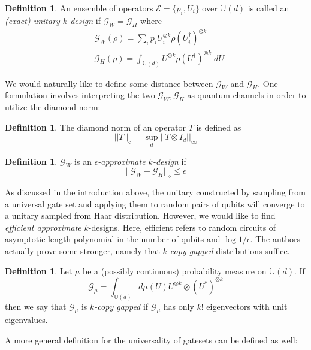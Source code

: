 \documentclass[12pt]{amsart}
\theoremstyle{definition}
\newtheorem{definition}[theorem]{Definition}
\theoremstyle{remark}
\numberwithin{equation}{section}
\theoremstyle{remark}
\begin{document}
\begin{definition}
  An ensemble of operators $\mathcal{E} = \{p_i, U_i\}$ over $\mathbb{U}(d)$ is called an \emph{(exact) unitary $k$-design} if $\mathcal{G}_W = \mathcal{G}_H$ where
  \begin{align}
    & \mathcal{G}_W(\rho) = \sum_{i} p_i U_i^{\otimes k}\rho (U_i^{\dagger})^{\otimes k} \\
    & \mathcal{G}_H(\rho) = \int_{\mathbb{U}(d)} U^{\otimes k} \rho (U^\dagger)^{\otimes k} \; dU
  \end{align}
\end{definition}
%
 We would naturally like to define some distance between $\mathcal{G}_W$ and $\mathcal{G}_H$. One formulation involves interpreting the two $\mathcal{G}_W, \mathcal{G}_H$ as quantum channels in order to utilize the diamond norm:
%
\begin{definition}
  The diamond norm of an operator $T$ is defined as
  $$||T||_{\diamond} = \sup_d ||T \otimes I_d ||_{\infty} $$
\end{definition}
%
\begin{definition}
  $\mathcal{G}_W$ is an \emph{$\epsilon$-approximate $k$-design} if
  \begin{equation}
    ||\mathcal{G}_W - \mathcal{G}_H ||_{\diamond}  \leq \epsilon
  \end{equation}
\end{definition}
%
As discussed in the introduction above, the unitary constructed by sampling from a universal gate set and applying them to random pairs of qubits will converge to a unitary sampled from Haar distribution. However, we would like to find \emph{efficient approximate} $k$-designs. Here, efficient refers to random circuits of asymptotic length polynomial in the number of qubits and $\log 1/\epsilon$. The authors actually prove some stronger, namely that \emph{$k$-copy gapped} distributions suffice.
%
\begin{definition} \label{gappeddef}
  Let $\mu$ be a (possibly continuous) probability measure on $\mathbb{U}(d)$. If
  \begin{equation}
    \mathcal{G}_{\mu} = \int_{\mathbb{U}(d)} d\mu(U) U^{\otimes k} \otimes (U^*)^{\otimes k}
  \end{equation}
  then we say that $\mathcal{G}_\mu$ is \emph{$k$-copy gapped} if $\mathcal{G}_\mu$ has only $k!$ eigenvectors with unit eigenvalues.
\end{definition}
%
\noindent A more general definition for the universality of gatesets can be defined as well:
\end{document}

